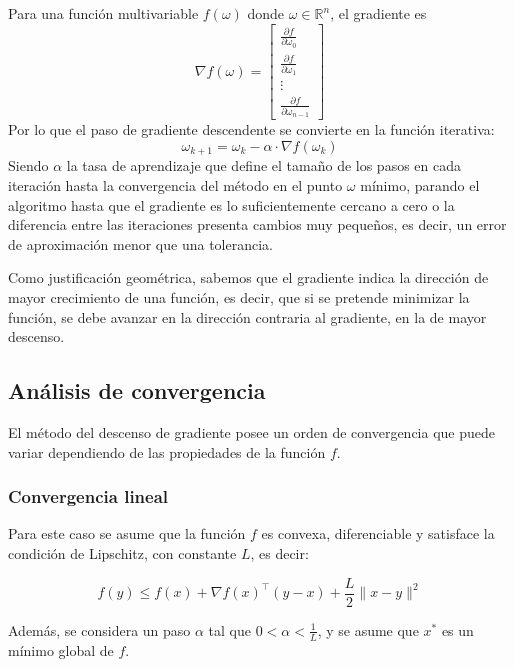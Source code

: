 \documentclass[conference]{IEEEtran}
\begin{document}
Para una función multivariable $f(\omega)$ donde $\omega \in \mathbb{R}^n$, el gradiente es $$\nabla f(\omega)=\begin{bmatrix}
\frac{ \partial f }{ \partial \omega_{0} }  \\
\frac{ \partial f }{ \partial \omega_{1} }  \\
\vdots \\
\frac{ \partial f }{ \partial \omega_{n-1} } 
\end{bmatrix}$$
Por lo que el paso de gradiente descendente se convierte en la función iterativa:
\begin{equation}
\omega_{k+1}=\omega_{k}-\alpha\cdot \nabla f(\omega_{k}) \label{grad desc}    
\end{equation}
Siendo $\alpha$ la tasa de aprendizaje que define el tamaño de los pasos en cada iteración hasta la convergencia del método en el punto $\omega$ mínimo, parando el algoritmo hasta que el gradiente es lo suficientemente cercano a cero o la diferencia entre las iteraciones presenta cambios muy pequeños, es decir, un error de aproximación menor que una tolerancia.

Como justificación geométrica, sabemos que el gradiente indica la dirección de mayor crecimiento de una función, es decir, que si se pretende minimizar la función, se debe avanzar en la dirección contraria al gradiente, en la de mayor descenso.
\subsection{Análisis de convergencia}\label{sec1:3}

El método del descenso de gradiente posee un orden de convergencia que puede variar dependiendo de las propiedades de la función $f$.

\subsubsection{Convergencia lineal}

Para este caso se asume que la función $f$ es convexa, diferenciable y satisface la condición de Lipschitz, con constante $L$, es decir:

\begin{equation}
f(y) \leq f(x) + \nabla f(x)^\top (y - x) + \frac{L}{2} \|x - y\|^2 \label{eq:lipschitz}
\end{equation}

Además, se considera un paso $\alpha$ tal que $0 < \alpha < \frac{1}{L}$, y se asume que $x^*$ es un mínimo global de $f$.
\end{document}
